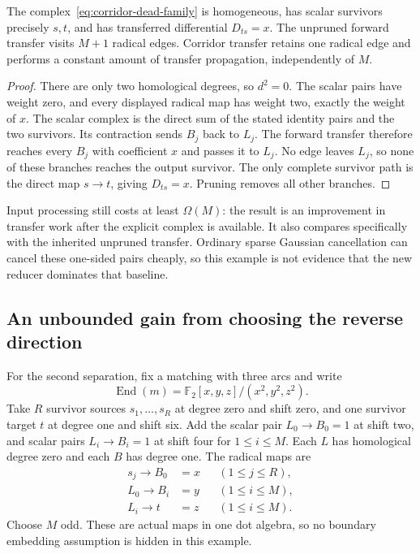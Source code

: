 \begin{proposition}\label{prop:corridor-dead}
The complex~\eqref{eq:corridor-dead-family} is homogeneous, has scalar
survivors precisely $s,t$, and has transferred differential $D_{ts}=x$.
The unpruned forward transfer visits $M+1$ radical edges.  Corridor transfer
retains one radical edge and performs a constant amount of transfer
propagation, independently of $M$.
\end{proposition}
\begin{proof}
There are only two homological degrees, so $d^2=0$.  The scalar pairs have
weight zero, and every displayed radical map has weight two, exactly the
weight of $x$.  The scalar complex is the direct sum of the stated identity
pairs and the two survivors.  Its contraction sends $B_j$ back to $L_j$.
The forward transfer therefore reaches every $B_j$ with coefficient $x$ and
passes it to $L_j$.  No edge leaves $L_j$, so none of these branches reaches
the output survivor.  The only complete survivor path is the direct map
$s\to t$, giving $D_{ts}=x$.  Pruning removes all other branches.
\end{proof}

Input processing still costs at least $\Omega(M)$: the result is an
improvement in transfer work after the explicit complex is available.  It
also compares specifically with the inherited unpruned transfer.  Ordinary
sparse Gaussian cancellation can cancel these one-sided pairs cheaply, so
this example is not evidence that the new reducer dominates that baseline.

\subsection{An unbounded gain from choosing the reverse direction}

For the second separation, fix a matching with three arcs and write
\[
 \operatorname{End}(m)=
 \mathbb F_2[x,y,z]/(x^2,y^2,z^2).
\]
Take $R$ survivor sources $s_1,\ldots,s_R$ at degree zero and shift zero,
and one survivor target $t$ at degree one and shift six.  Add the scalar
pair $L_0\to B_0=1$ at shift two, and scalar pairs
$L_i\to B_i=1$ at shift four for $1\le i\le M$.  Each $L$ has homological
degree zero and each $B$ has degree one.  The radical maps are
\begin{align}
 s_j\longrightarrow B_0&=x &&(1\le j\le R),\label{eq:corridor-suffix-u}\\
 L_0\longrightarrow B_i&=y &&(1\le i\le M),\label{eq:corridor-suffix-a}\\
 L_i\longrightarrow t&=z &&(1\le i\le M).
 \label{eq:corridor-suffix-v}
\end{align}
Choose $M$ odd.  These are actual maps in one dot algebra, so no boundary
embedding assumption is hidden in this example.

